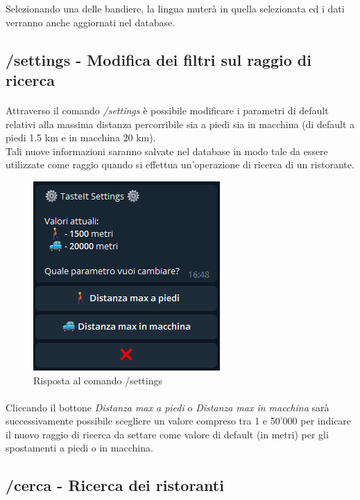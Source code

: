 \documentclass[a4paper, 12pt]{article}
\begin{document}
	Selezionando una delle bandiere, la lingua muterà in quella selezionata ed i dati verranno anche aggiornati nel database.
	
	\subsection{/settings - Modifica dei filtri sul raggio di ricerca}
	\paragraph{}
	Attraverso il comando \textit{/settings} è possibile modificare i parametri di default relativi alla massima distanza percorribile sia a piedi sia in macchina (di default a piedi 1.5 km e in macchina 20 km).\\
	Tali nuove informazioni saranno salvate nel database in modo tale da essere utilizzate come raggio quando si effettua un'operazione di ricerca di un ristorante.
	\newpage
	\begin{figure}[h]
		\centering
		\includegraphics[scale=0.9]{settingsCommand.png}
		\caption{Risposta al comando /settings}
	\end{figure}
	\paragraph{}
	Cliccando il bottone \textit{Distanza max a piedi} o \textit{Distanza max in macchina} sarà successivamente possibile scegliere un valore compreso tra 1 e 50'000 per indicare il nuovo raggio di ricerca da settare come valore di default (in metri) per gli spostamenti a piedi o in macchina.\\
	
	\subsection{/cerca - Ricerca dei ristoranti}
\end{document}
